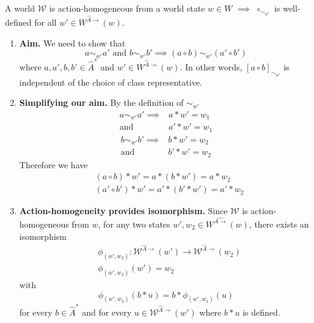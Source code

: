 \begin{propositionE}
    A world $\mathscr{W}$ is action-homogeneous from a world state $w \in W$ $\implies$ $\circ_{\sim_{w'}}$ is well-defined for all $w' \in W^{\hat{A}\to}(w)$.
\end{propositionE}
\begin{proofE}
\begin{enumerate}
    \item \textbf{Aim.}
    We need to show that
    \begin{equation}
        a \sim_{w'} a' \text{ and } b \sim_{w'} b' \implies (a \circ b) \sim_{w'} (a' \circ b')
    \end{equation}
    where $a, a', b, b' \in \hat{A}^{*}$ and $w' \in W^{\hat{A}\to}(w)$.
    In other words, $[a \circ b]_{\sim_{w'}}$ is independent of the choice of class representative.

    \item \textbf{Simplifying our aim.}
    By the definition of $\sim_{w'}$
    \begin{equation}
    \begin{aligned}
        a \sim_{w'} a' \implies & a \ast w' = w_{1} \\
        \text{and } & a' \ast w' = w_{1}
    \end{aligned}
    \end{equation}
    \begin{equation}
    \begin{aligned}
        b \sim_{w'} b' \implies & b \ast w' = w_{2} \\
        \text{and } & b' \ast w' = w_{2}
    \end{aligned}
    \end{equation}
    Therefore we have
    \begin{align}
        & (a \circ b) \ast w' = a \ast (b \ast w') = a \ast w_{2} \\
        & (a' \circ b') \ast w' = a' \ast (b' \ast w') = a' \ast w_{2}
    \end{align}

    \item \textbf{Action-homogeneity provides isomorphism.}
    Since $\mathscr{W}$ is action-homogeneous from $w$, for any two states $w', w_{2} \in W^{\hat{A\to}}(w)$, there exists an isomorphism
    \begin{align}
        & \phi_{(w', w_{2})}: \mathscr{W}^{\hat{A}\to}(w') \to \mathscr{W}^{\hat{A}\to}(w_{2}) \\
        & \phi_{(w', w_{2})}(w') = w_{2}
    \end{align}
    with
    \begin{equation}
        \phi_{(w', w_{2})}(b \ast u) = b \ast \phi_{(w', w_{2})}(u)
    \end{equation}
    for every $b \in \hat{A}^{*}$ and for every $u \in \mathscr{W}^{\hat{A}\to}(w')$ where $b \ast u$ is defined.


\end{enumerate}
\end{proofE}
